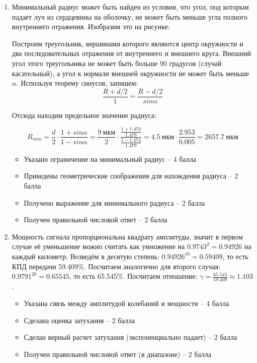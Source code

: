 \begin{enumerate}
		\item Минимальный радиус может быть найден из условия, что угол, под которым падает луч из сердцевины на оболочку, не может быть меньше угла полного внутреннего отражения. Изобразим это на рисунке:
		

		Построим треугольник, вершинами которого являются центр окружности и два последовательных отражения от внутреннего и внешнего круга. Внешний угол этого треугольника не может быть больше 90 градусов (случай касательный), а угол к нормали внешней окружности не может быть меньше $\alpha$. Используя теорему синусов, запишем: 
		$$\frac{R+d/2}{1}=\frac{R-d/2}{sin\alpha}$$  
		
		Отсюда находим предельное значение радиуса:

		$$R_{min}=\frac{d}{2} \cdot \frac{1+sin\alpha}{1-sin\alpha}=\frac{9 \: \text{мкм}}{2} \cdot \frac{\frac{1+1.474}{1.479}}{\frac{1- 1.474}{1.479}}=4.5 \: \text{мкм} \cdot \frac{2.953}{0.005}=2657.7 \: \text{мкм}$$
		
		
		\markSection

		\begin{itemize} 
			\item Указано ограничение на минимальный радиус – 4 балла
			\item Приведены геометрические соображения для нахождения радиуса – 2 балла
			\item Получено выражение для минимального радиуса – 2 балла
			\item Получен правильной числовой ответ – 2 балла
		\end{itemize}

		\item Мощность сигнала пропорциональна квадрату амплитуды, значит в первом случае её уменьшение можно считать как умножение на $0.9743^2 = 0.94926$ на каждый километр. Возведём в десятую степень: $0.94926^{10} = 0.59409$, то есть КПД передачи 59.409\%. Посчитаем аналогично для второго случая: $0.9791^{20} = 0.65545$, то есть 65.545\%. Посчитаем отношение: $\gamma=\frac{65.545}{59.409} \approx 1.103$.
		

		\markSection

		\begin{itemize}
			\item Указана связь между амплитудой колебаний и мощности – 4 балла
			\item Сделана оценка затухания – 2 балла
			\item Сделан верный расчет затухания (экспоненциально падает) – 2 балла
			\item Получен правильной числовой ответ (в диапазоне) – 2 балла
		\end{itemize}


\end{enumerate}
